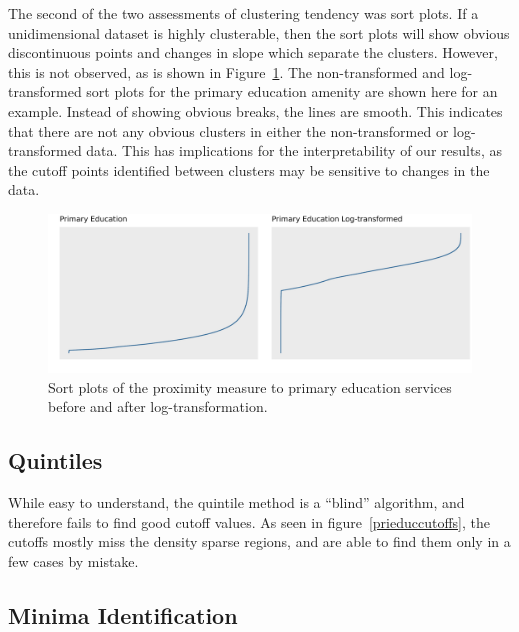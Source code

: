 \documentclass[11pt, a4paper]{article}
\begin{document}
The second of the two assessments of clustering tendency was sort plots. If a unidimensional dataset is highly clusterable, then the sort plots will show obvious discontinuous points and changes in slope which separate the clusters. However, this is not observed, as is shown in Figure~\ref{sortplotcompare}. The non-transformed and log-transformed sort plots for the primary education amenity are shown here for an example. Instead of showing obvious breaks, the lines are smooth. This indicates that there are not any obvious clusters in either the non-transformed or log-transformed data. This has implications for the interpretability of our results, as the cutoff points identified between clusters may be sensitive to changes in the data.






\begin{figure}[H]
\centering
\includegraphics[width=\textwidth]{./sort_plot/sort_comparison.png}
\caption[Primary education sort plot]{Sort plots of the proximity measure to primary education services before and after log-transformation.}\label{sortplotcompare}
\end{figure}








\subsection{Quintiles}

While easy to understand, the quintile method is a ``blind'' algorithm, and therefore fails to find good cutoff values. As seen in figure~\ref{prieduccutoffs}, the cutoffs mostly miss the density sparse regions, and are able to find them only in a few cases by mistake.






\subsection{Minima Identification}
\end{document}
